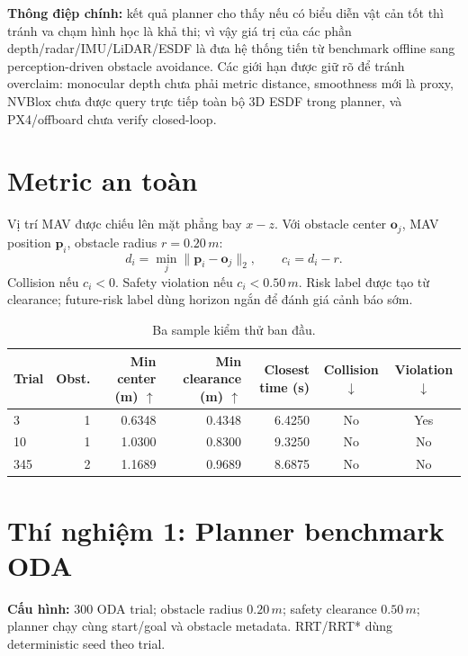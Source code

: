 \documentclass[10pt,a4paper]{article}
\begin{document}
\textbf{Thông điệp chính:} kết quả planner cho thấy nếu có biểu diễn vật cản tốt thì tránh va chạm hình học là khả thi; vì vậy giá trị của các phần depth/radar/IMU/LiDAR/ESDF là đưa hệ thống tiến từ benchmark offline sang perception-driven obstacle avoidance. Các giới hạn được giữ rõ để tránh overclaim: monocular depth chưa phải metric distance, smoothness mới là proxy, NVBlox chưa được query trực tiếp toàn bộ 3D ESDF trong planner, và PX4/offboard chưa verify closed-loop.

\section{Metric an toàn}

Vị trí MAV được chiếu lên mặt phẳng bay \(x-z\). Với obstacle center \(\mathbf{o}_j\), MAV position \(\mathbf{p}_i\), obstacle radius \(r=0.20\,m\):
\[
d_i = \min_j \|\mathbf{p}_i-\mathbf{o}_j\|_2,\qquad c_i=d_i-r.
\]
Collision nếu \(c_i < 0\). Safety violation nếu \(c_i < 0.50\,m\). Risk label được tạo từ clearance; future-risk label dùng horizon ngắn để đánh giá cảnh báo sớm.

\begin{table}[H]
\centering
\small
\caption{Ba sample kiểm thử ban đầu.}
\begin{tabular}{lrrrrcc}
\toprule
Trial & Obst. & Min center (m) $\uparrow$ & Min clearance (m) $\uparrow$ & Closest time (s) & Collision $\downarrow$ & Violation $\downarrow$ \\
\midrule
3 & 1 & 0.6348 & 0.4348 & 6.4250 & No & Yes \\
10 & 1 & 1.0300 & 0.8300 & 9.3250 & No & No \\
345 & 2 & 1.1689 & 0.9689 & 8.6875 & No & No \\
\bottomrule
\end{tabular}
\end{table}

\section{Thí nghiệm 1: Planner benchmark ODA}

\textbf{Cấu hình:} 300 ODA trial; obstacle radius \(0.20\,m\); safety clearance \(0.50\,m\); planner chạy cùng start/goal và obstacle metadata. RRT/RRT* dùng deterministic seed theo trial.
\end{document}
